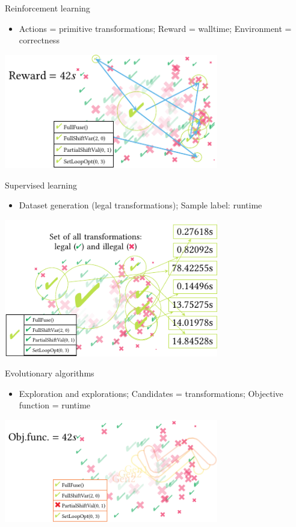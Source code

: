 \documentclass[presentation, aspectratio=169]{beamer}
\begin{document}
\begin{frame}[label={sec:orgd4bb48c}]{Reinforcement learning}
\begin{itemize}
\item Actions = primitive transformations; Reward = walltime; Environment = correctness
\end{itemize}
\begin{center}
\includegraphics[width=0.7\textwidth]{./figs/ml-rl.pdf}
\end{center}
\end{frame}
\begin{frame}[label={sec:org921dcb3}]{Supervised learning}
\begin{itemize}
\item Dataset generation (legal transformations); Sample label: runtime
\end{itemize}
\begin{center}
\includegraphics[width=0.7\textwidth]{./figs/ml-sl.pdf}
\end{center}
\end{frame}
\begin{frame}[label={sec:orgb938ab6}]{Evolutionary algorithms}
\begin{itemize}
\item Exploration and explorations; Candidates = transformations; Objective function = runtime
\end{itemize}
\begin{center}
\includegraphics[width=0.7\textwidth]{./figs/ml-ea.pdf}
\end{center}
\end{frame}
\end{document}
